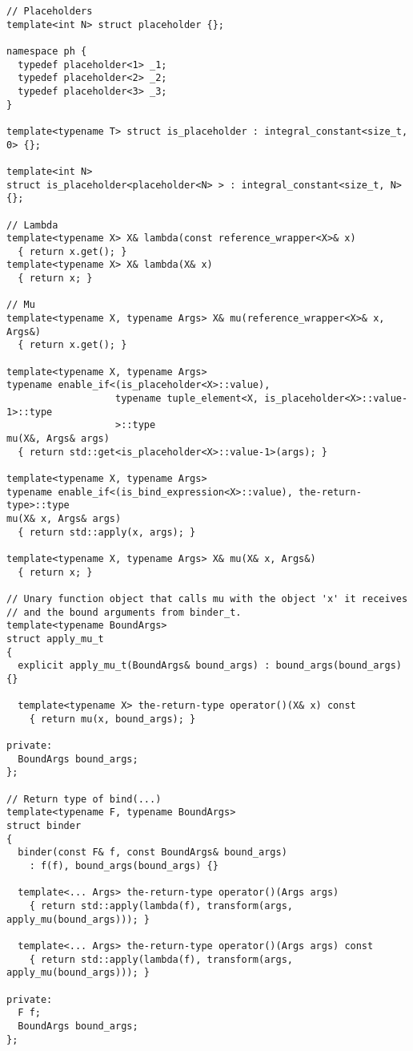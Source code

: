 \documentclass{article}
\begin{document}
 \small
\begin{verbatim}
// Placeholders
template<int N> struct placeholder {};

namespace ph {
  typedef placeholder<1> _1;
  typedef placeholder<2> _2;
  typedef placeholder<3> _3;
}

template<typename T> struct is_placeholder : integral_constant<size_t, 0> {};

template<int N> 
struct is_placeholder<placeholder<N> > : integral_constant<size_t, N> {};

// Lambda
template<typename X> X& lambda(const reference_wrapper<X>& x)
  { return x.get(); }
template<typename X> X& lambda(X& x)
  { return x; }

// Mu
template<typename X, typename Args> X& mu(reference_wrapper<X>& x, Args&)
  { return x.get(); }

template<typename X, typename Args>
typename enable_if<(is_placeholder<X>::value),
                   typename tuple_element<X, is_placeholder<X>::value-1>::type
                   >::type
mu(X&, Args& args)
  { return std::get<is_placeholder<X>::value-1>(args); }

template<typename X, typename Args>
typename enable_if<(is_bind_expression<X>::value), the-return-type>::type
mu(X& x, Args& args)
  { return std::apply(x, args); }

template<typename X, typename Args> X& mu(X& x, Args&)
  { return x; }

// Unary function object that calls mu with the object 'x' it receives
// and the bound arguments from binder_t.
template<typename BoundArgs>
struct apply_mu_t
{
  explicit apply_mu_t(BoundArgs& bound_args) : bound_args(bound_args) {}

  template<typename X> the-return-type operator()(X& x) const
    { return mu(x, bound_args); }

private:
  BoundArgs bound_args;
};

// Return type of bind(...)
template<typename F, typename BoundArgs>
struct binder
{
  binder(const F& f, const BoundArgs& bound_args)
    : f(f), bound_args(bound_args) {}

  template<... Args> the-return-type operator()(Args args)
    { return std::apply(lambda(f), transform(args, apply_mu(bound_args))); }

  template<... Args> the-return-type operator()(Args args) const
    { return std::apply(lambda(f), transform(args, apply_mu(bound_args))); }

private:
  F f;
  BoundArgs bound_args;
};


\end{verbatim}
\end{document}
